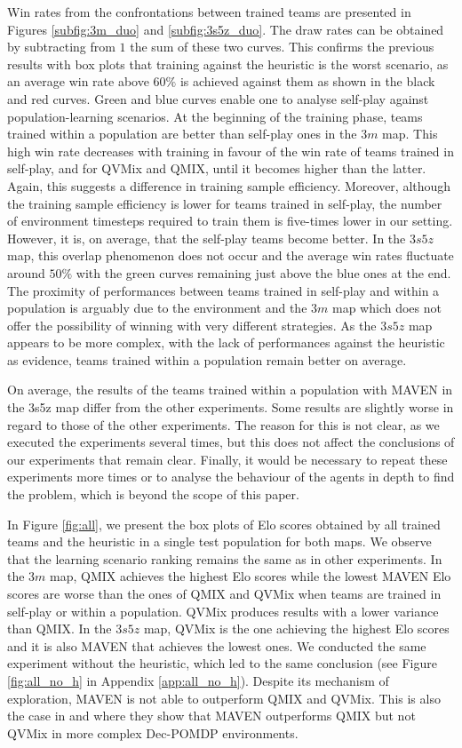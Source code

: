 Win rates from the confrontations between trained teams are presented in Figures \ref{subfig:3m_duo} and \ref{subfig:3s5z_duo}.
The draw rates can be obtained by subtracting from $1$ the sum of these two curves.
This confirms the previous results with box plots that training against the heuristic is the worst scenario, as an average win rate above $60\%$ is achieved against them as shown in the black and red curves.
Green and blue curves enable one to analyse self-play against population-learning scenarios.
At the beginning of the training phase, teams trained within a population are better than self-play ones in the $3m$ map.
This high win rate decreases with training in favour of the win rate of teams trained in self-play, and for QVMix and QMIX, until it becomes higher than the latter.
Again, this suggests a difference in training sample efficiency.
Moreover, although the training sample efficiency is lower for teams trained in self-play, the number of environment timesteps required to train them is five-times lower in our setting.
However, it is, on average, that the self-play teams become better.
In the $3s5z$ map, this overlap phenomenon does not occur and the average win rates fluctuate around $50\%$ with the green curves remaining just above the blue ones at the end.
The proximity of performances between teams trained in self-play and within a population is arguably due to the environment and the $3m$ map which does not offer the possibility of winning with very different strategies.
As the $3s5z$ map appears to be more complex, with the lack of performances against the heuristic as evidence, teams trained within a population remain better on average.

On average, the results of the teams trained within a population with MAVEN in the 3s5z map differ from the other experiments. 
Some results are slightly worse in regard to those of the other experiments.
The reason for this is not clear, as we executed the experiments several times, but this does not affect the conclusions of our experiments that remain clear.
Finally, it would be necessary to repeat these experiments more times or to analyse the behaviour of the agents in depth to find the problem, which is beyond the scope of this paper. 

In Figure \ref{fig:all}, we present the box plots of Elo scores obtained by all trained teams and the heuristic in a single test population for both maps.
We observe that the learning scenario ranking remains the same as in other experiments.
In the $3m$ map, QMIX achieves the highest Elo scores while the lowest MAVEN Elo scores are worse than the ones of QMIX and QVMix when teams are trained in self-play or within a population.
QVMix produces results with a lower variance than QMIX.
In the $3s5z$ map, QVMix is the one achieving the highest Elo scores and it is also MAVEN that achieves the lowest ones.
We conducted the same experiment without the heuristic, which led to the same conclusion (see Figure \ref{fig:all_no_h} in Appendix \ref{app:all_no_h}).
Despite its mechanism of exploration, MAVEN is not able to outperform QMIX and QVMix.
This is also the case in \citep{Mahajan2019MAVEN:Exploration} and \citep{leroy2020qvmix} where they show that MAVEN outperforms QMIX but not QVMix in more complex Dec-POMDP environments.

